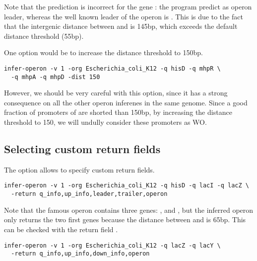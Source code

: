 Note that the prediction is incorrect for the gene : the
program predict  as operon leader, whereas the well known
leader of the  operon is . This is due to the
fact that the intergenic distance between  and 
is 145bp, which exceeds the default distance threshold (55bp). 

One option would be to increase the distance threshold to 150bp. 


{\color{Blue} \begin{footnotesize}
\begin{verbatim}
infer-operon -v 1 -org Escherichia_coli_K12 -q hisD -q mhpR \
  -q mhpA -q mhpD -dist 150
\end{verbatim} \end{footnotesize}
}

However, we should be very careful with this option, since it has a
strong consequence on all the other operon inferenes in the same
genome. Since a good fraction of promoters of 
are shorted than 150bp, by increasing the distance threshold to 150,
we will undully consider these promoters as WO.

\subsection{Selecting custom return fields}

The option  allows to specify custom return fields.

{\color{Blue} \begin{footnotesize}
\begin{verbatim}
infer-operon -v 1 -org Escherichia_coli_K12 -q hisD -q lacI -q lacZ \
  -return q_info,up_info,leader,trailer,operon
\end{verbatim} \end{footnotesize}
}

Note that the famous  operon contains three genes:
,  and , but the inferred operon only
returns the two first genes because the distance between 
and \gene{lacA} is 65bp. This can be checked with the return field
\option{down\_info}.

{\color{Blue} \begin{footnotesize}
\begin{verbatim}
infer-operon -v 1 -org Escherichia_coli_K12 -q lacZ -q lacY \
  -return q_info,up_info,down_info,operon
\end{verbatim} \end{footnotesize}
}

